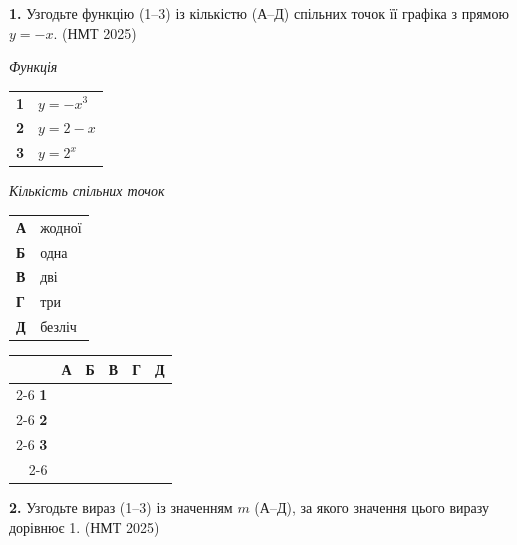 \documentclass[14pt]{extarticle}
\newcommand{\answerGrid}{
    \begingroup
    \setlength{\tabcolsep}{4pt}
    \renewcommand{\arraystretch}{1.2}
    \small
    \begin{tabular}{r|c|c|c|c|c|}
         \multicolumn{1}{c}{} & \multicolumn{1}{c}{\textbf{А}} & \multicolumn{1}{c}{\textbf{Б}} & \multicolumn{1}{c}{\textbf{В}} & \multicolumn{1}{c}{\textbf{Г}} & \multicolumn{1}{c}{\textbf{Д}} \\ \cline{2-6}
         \textbf{1} & & & & & \\ \cline{2-6}
         \textbf{2} & & & & & \\ \cline{2-6}
         \textbf{3} & & & & & \\ \cline{2-6}
    \end{tabular}
    \endgroup
}
\newcommand{\nmtyear}[1]{\hfill{\small\color{yearcolor}(НМТ #1)}}
\begin{document}
\noindent\textbf{1.} Узгодьте функцію (1–3) із кількістю (А–Д) спільних точок її графіка з прямою $y = -x$. \nmtyear{2025}
\vspace{0.3cm}

\noindent
\begin{minipage}[t]{0.30\textwidth}
    \textit{Функція} \par \vspace{0.2cm}
    \begin{tabular}{@{}p{0.5cm} l@{}}
    \textbf{1} & $y = -x^3$ \\[0.4cm]
    \textbf{2} & $y = 2 - x$ \\[0.4cm]
    \textbf{3} & \colorbox{yellow!30}{$y = 2^x$} \\
    \end{tabular}
\end{minipage}%
\hfill
\begin{minipage}[t]{0.40\textwidth}
    \textit{Кількість спільних точок} \par \vspace{0.2cm}
    \begin{tabular}{@{}p{0.5cm} l@{}}
    \textbf{А} & жодної \\[0.2cm]
    \textbf{Б} & одна \\[0.2cm]
    \textbf{В} & дві \\[0.2cm]
    \textbf{Г} & три \\[0.2cm]
    \textbf{Д} & безліч \\
    \end{tabular}
\end{minipage}%
\hfill
\begin{minipage}[t]{0.25\textwidth}
    \raggedleft
    \answerGrid
\end{minipage}
\vspace{0.7cm}

\noindent\textbf{2.} Узгодьте вираз (1–3) із значенням $m$ (А–Д), за якого значення цього виразу дорівнює 1. \nmtyear{2025}
\vspace{0.3cm}
\end{document}
